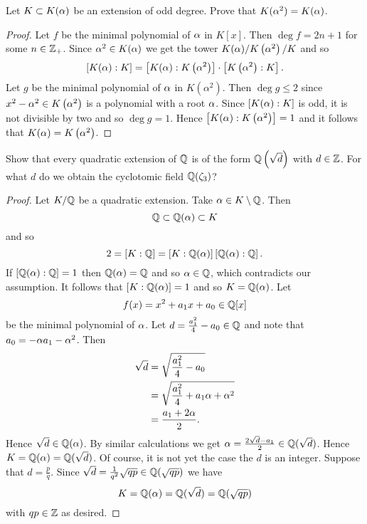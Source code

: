     \begin{ex}{21.19}
        Let $K\subset K(\alpha)$ be an extension of odd degree. Prove that $K(\alpha^2)=K(\alpha)$.
    \end{ex}
    \begin{proof}
        Let $f$ be the minimal polynomial of $\alpha$ in $K[x]$. Then $\deg f=2n+1$ for some $n\in\mathbb{Z}_+$. 
        Since $\alpha^2\in K(\alpha)$ we get the tower $K(\alpha)/K\left(\alpha^2\right)/K$ and so\
        $$ \left[K(\alpha):K\right]=\left[K(\alpha):K\left(\alpha^2\right)\right]\cdot\left[K\left(\alpha^2\right):K\right].$$
        Let $g$ be the minimal polynomial of $\alpha$ in $K\left(\alpha^2\right)$. Then $\deg g\leq 2$ since $x^2-\alpha^2\in K\left(\alpha^2\right)$ is a polynomial with a root $\alpha$.
        Since $\left[K(\alpha):K\right]$ is odd, it is not divisible by two and so $\deg g = 1$. Hence $\left[K(\alpha):K\left(\alpha^2\right)\right]=1$ and it follows that $K(\alpha)=K\left(\alpha^2\right)$.
    \end{proof}

    \begin{ex}{21.23}
        Show that every quadratic extension of $\mathbb{Q}$ is of the form $\mathbb{Q}\left(\sqrt{d}\right)$ with $d\in\mathbb{Z}$.
        For what $d$ do we obtain the cyclotomic field $\mathbb{Q}(\zeta_3)$?
    \end{ex}
    \begin{proof}
        Let $K/\mathbb{Q}$ be a quadratic extension. Take $\alpha\in K\setminus\mathbb{Q}$. Then 
        $$ \mathbb{Q}\subset\mathbb{Q}(\alpha)\subset K $$
        and so
        $$2=\left[K:\mathbb{Q}\right]=\left[K:\mathbb{Q}(\alpha)\right]\left[\mathbb{Q}(\alpha):\mathbb{Q}\right].$$
        If $\left[\mathbb{Q}(\alpha):\mathbb{Q}\right]=1$ then $\mathbb{Q}(\alpha)=\mathbb{Q}$ and so $\alpha\in\mathbb{Q}$, which contradicts our assumption. 
        It follows that $\left[K:\mathbb{Q}(\alpha)\right]=1$ and so $K=\mathbb{Q}(\alpha)$. 
        Let 
        $$f(x)=x^2+a_1 x+a_0\in\mathbb{Q}[x]$$
        be the minimal polynomial of $\alpha$. 
        Let $d=\frac{a_1^2}{4}-a_0\in\mathbb{Q}$ and note that $a_0=-\alpha a_1-\alpha^2$. Then
        \begin{align*}
            \sqrt{d}&=\sqrt{\frac{a_1^2}{4}-a_0}\\
            &=\sqrt{\frac{a_1^2}{4}+a_1\alpha+\alpha^2}\\
            &=\frac{a_1+2\alpha}{2}.
        \end{align*}
        Hence $\sqrt{d}\in\mathbb{Q}(\alpha)$. By similar calculations we get $\alpha=\frac{2\sqrt{d}-a_1}{2}\in\mathbb{Q}(\sqrt{d})$.
        Hence $K=\mathbb{Q}(\alpha)=\mathbb{Q}(\sqrt{d})$. Of course, it is not yet the case the $d$ is an integer.
        Suppose that $d=\frac{p}{q}$. Since $\sqrt{d}=\frac{1}{q^2}\sqrt{qp}\in\mathbb{Q}(\sqrt{qp})$ we have
        $$K=\mathbb{Q}(\alpha)=\mathbb{Q}(\sqrt{d})=\mathbb{Q}(\sqrt{qp})$$
        with $qp\in\mathbb{Z}$ as desired.
    \end{proof}

